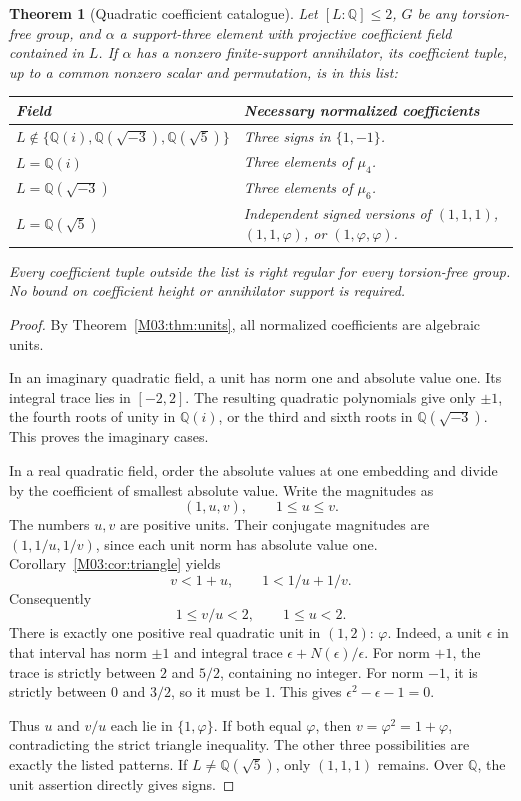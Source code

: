 \documentclass[11pt,a4paper,oneside]{report}
\newtheorem{theorem}{Theorem}[section]
\theoremstyle{definition}
\theoremstyle{remark}
\newcommand{\Q}{\mathbb Q}
\newcommand{\ph}{\varphi}
\begin{document}
\begin{theorem}[Quadratic coefficient catalogue]\label{M03:thm:quadratic}
Let \([L:\Q]\le2\), \(G\) be any torsion-free group, and \(\alpha\) a support-three element with projective coefficient field contained in \(L\). If \(\alpha\) has a nonzero finite-support annihilator, its coefficient tuple, up to a common nonzero scalar and permutation, is in this list:
\begin{center}
\begin{tabular}{@{}P{57mm}P{87mm}@{}}
\toprule Field & Necessary normalized coefficients\\
\midrule
\(L\notin\{\Q(i),\Q(\sqrt{-3}),\Q(\sqrt5)\}\) & Three signs in \(\{1,-1\}\).\\[4pt]
\(L=\Q(i)\) & Three elements of \(\mu_4\).\\[4pt]
\(L=\Q(\sqrt{-3})\) & Three elements of \(\mu_6\).\\[4pt]
\(L=\Q(\sqrt5)\) & Independent signed versions of \((1,1,1)\), \((1,1,\ph)\), or \((1,\ph,\ph)\).\\
\bottomrule
\end{tabular}
\end{center}
Every coefficient tuple outside the list is right regular for every torsion-free group. No bound on coefficient height or annihilator support is required.
\end{theorem}
\begin{proof}
By Theorem~\ref{M03:thm:units}, all normalized coefficients are algebraic units.

In an imaginary quadratic field, a unit has norm one and absolute value one. Its integral trace lies in \([-2,2]\). The resulting quadratic polynomials give only \(\pm1\), the fourth roots of unity in \(\Q(i)\), or the third and sixth roots in \(\Q(\sqrt{-3})\). This proves the imaginary cases.

In a real quadratic field, order the absolute values at one embedding and divide by the coefficient of smallest absolute value. Write the magnitudes as
\[
(1,u,v),\qquad 1\le u\le v.
\]
The numbers \(u,v\) are positive units. Their conjugate magnitudes are \((1,1/u,1/v)\), since each unit norm has absolute value one. Corollary~\ref{M03:cor:triangle} yields
\[
v<1+u,\qquad 1<1/u+1/v.
\]
Consequently
\begin{equation}\label{M03:eq:smallunits}
1\le v/u<2,\qquad 1\le u<2.
\end{equation}
There is exactly one positive real quadratic unit in \((1,2)\): \(\ph\). Indeed, a unit \(\epsilon\) in that interval has norm \(\pm1\) and integral trace \(\epsilon+N(\epsilon)/\epsilon\). For norm \(+1\), the trace is strictly between \(2\) and \(5/2\), containing no integer. For norm \(-1\), it is strictly between \(0\) and \(3/2\), so it must be \(1\). This gives \(\epsilon^2-\epsilon-1=0\).

Thus \(u\) and \(v/u\) each lie in \(\{1,\ph\}\). If both equal \(\ph\), then \(v=\ph^2=1+\ph\), contradicting the strict triangle inequality. The other three possibilities are exactly the listed patterns. If \(L\ne\Q(\sqrt5)\), only \((1,1,1)\) remains. Over \(\Q\), the unit assertion directly gives signs.
\end{proof}
\end{document}
